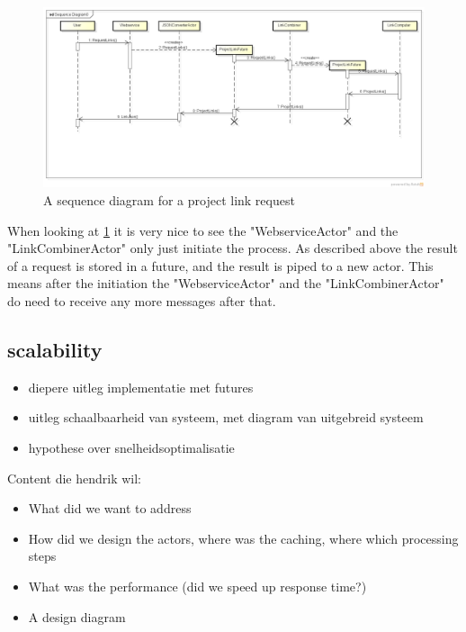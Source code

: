\documentclass[10pt,a4paper]{article}
\begin{document}
\begin{figure}[htb]
    \centering
    \includegraphics[width=1.0\textwidth]{ActorSequence}
    \caption{A sequence diagram for a project link request}
    \label{fig:actorSequence}
\end{figure}


When looking at \ref{fig:actorSequence} it is very nice to see the "WebserviceActor" and the "LinkCombinerActor" only just initiate the process. As described above the result of a request is stored in a future, and the result is piped to a new actor. This means after the initiation the "WebserviceActor" and the "LinkCombinerActor" do need to receive any more messages after that.


\subsection{scalability}

\begin{itemize}
	\item diepere uitleg implementatie met futures
	\item uitleg schaalbaarheid van systeem, met diagram van uitgebreid systeem
	\item hypothese over snelheidsoptimalisatie
\end{itemize}


Content die hendrik wil:

\begin{itemize}
    \item What did we want to address
    \item How did we design the actors, where was the caching, where which processing steps
    \item What was the performance (did we speed up response time?)
    \item A design diagram
\end{itemize}
\end{document}
